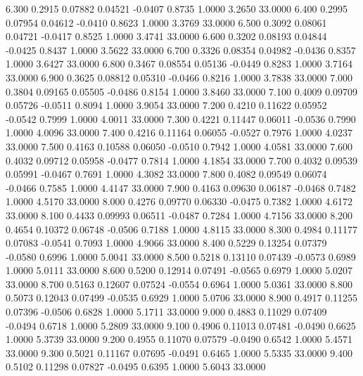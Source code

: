    6.300   0.2915   0.07882   0.04521  -0.0407   0.8735   1.0000   3.2650  33.0000
   6.400   0.2995   0.07954   0.04612  -0.0410   0.8623   1.0000   3.3769  33.0000
   6.500   0.3092   0.08061   0.04721  -0.0417   0.8525   1.0000   3.4741  33.0000
   6.600   0.3202   0.08193   0.04844  -0.0425   0.8437   1.0000   3.5622  33.0000
   6.700   0.3326   0.08354   0.04982  -0.0436   0.8357   1.0000   3.6427  33.0000
   6.800   0.3467   0.08554   0.05136  -0.0449   0.8283   1.0000   3.7164  33.0000
   6.900   0.3625   0.08812   0.05310  -0.0466   0.8216   1.0000   3.7838  33.0000
   7.000   0.3804   0.09165   0.05505  -0.0486   0.8154   1.0000   3.8460  33.0000
   7.100   0.4009   0.09709   0.05726  -0.0511   0.8094   1.0000   3.9054  33.0000
   7.200   0.4210   0.11622   0.05952  -0.0542   0.7999   1.0000   4.0011  33.0000
   7.300   0.4221   0.11447   0.06011  -0.0536   0.7990   1.0000   4.0096  33.0000
   7.400   0.4216   0.11164   0.06055  -0.0527   0.7976   1.0000   4.0237  33.0000
   7.500   0.4163   0.10588   0.06050  -0.0510   0.7942   1.0000   4.0581  33.0000
   7.600   0.4032   0.09712   0.05958  -0.0477   0.7814   1.0000   4.1854  33.0000
   7.700   0.4032   0.09539   0.05991  -0.0467   0.7691   1.0000   4.3082  33.0000
   7.800   0.4082   0.09549   0.06074  -0.0466   0.7585   1.0000   4.4147  33.0000
   7.900   0.4163   0.09630   0.06187  -0.0468   0.7482   1.0000   4.5170  33.0000
   8.000   0.4276   0.09770   0.06330  -0.0475   0.7382   1.0000   4.6172  33.0000
   8.100   0.4433   0.09993   0.06511  -0.0487   0.7284   1.0000   4.7156  33.0000
   8.200   0.4654   0.10372   0.06748  -0.0506   0.7188   1.0000   4.8115  33.0000
   8.300   0.4984   0.11177   0.07083  -0.0541   0.7093   1.0000   4.9066  33.0000
   8.400   0.5229   0.13254   0.07379  -0.0580   0.6996   1.0000   5.0041  33.0000
   8.500   0.5218   0.13110   0.07439  -0.0573   0.6989   1.0000   5.0111  33.0000
   8.600   0.5200   0.12914   0.07491  -0.0565   0.6979   1.0000   5.0207  33.0000
   8.700   0.5163   0.12607   0.07524  -0.0554   0.6964   1.0000   5.0361  33.0000
   8.800   0.5073   0.12043   0.07499  -0.0535   0.6929   1.0000   5.0706  33.0000
   8.900   0.4917   0.11255   0.07396  -0.0506   0.6828   1.0000   5.1711  33.0000
   9.000   0.4883   0.11029   0.07409  -0.0494   0.6718   1.0000   5.2809  33.0000
   9.100   0.4906   0.11013   0.07481  -0.0490   0.6625   1.0000   5.3739  33.0000
   9.200   0.4955   0.11070   0.07579  -0.0490   0.6542   1.0000   5.4571  33.0000
   9.300   0.5021   0.11167   0.07695  -0.0491   0.6465   1.0000   5.5335  33.0000
   9.400   0.5102   0.11298   0.07827  -0.0495   0.6395   1.0000   5.6043  33.0000

